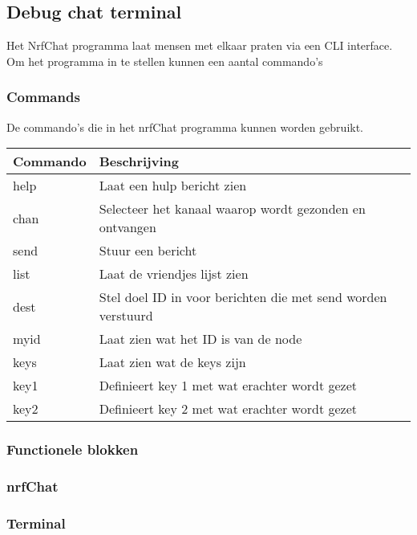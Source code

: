 \subsection{Debug chat terminal} \label{sec:debugProgram}

Het NrfChat programma laat mensen met elkaar praten via een CLI interface. Om het programma in te stellen kunnen een aantal commando's

\subsubsection{Commands}
De commando's die in het nrfChat programma kunnen worden gebruikt.

\begin{table}[h]
    \begin{tabular}{|l|l|} \hline
        \textbf{Commando} & \textbf{Beschrijving} \\\hline
        help & Laat een hulp bericht zien \\\hline
        chan & Selecteer het kanaal waarop wordt gezonden en ontvangen\\\hline
        send & Stuur een bericht \\\hline
        list & Laat de vriendjes lijst zien\\\hline
        dest & Stel doel ID in voor berichten die met send worden verstuurd \\\hline
        myid & Laat zien wat het ID is van de node \\\hline
        keys & Laat zien wat de keys zijn \\\hline
        key1 & Definieert key 1 met wat erachter wordt gezet\\\hline
        key2 & Definieert key 2 met wat erachter wordt gezet\\\hline
    \end{tabular}
\end{table}

\subsubsection{Functionele blokken}

\subsubsection{nrfChat}
    

\subsubsection{Terminal}
    
    

    